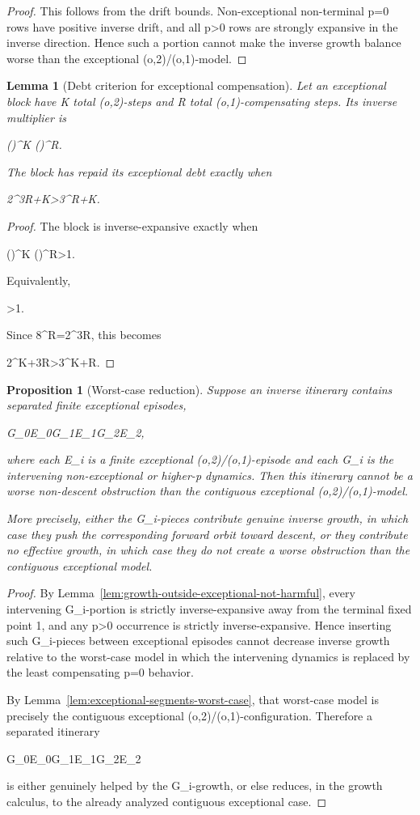 \documentclass[11pt,letterpaper]{amsart}
\def\({}%
\def\){}%
\def\[{ }%
\def\]{ }%
\theoremstyle{definition}
\theoremstyle{plain}
\newtheorem{lemma}{Lemma}
\newtheorem{proposition}{Proposition}
\theoremstyle{plain}
\theoremstyle{remark}
\begin{document}
\begin{proof}
This follows from the drift bounds.  Non-exceptional non-terminal \(p=0\) rows have positive inverse drift, and
all \(p>0\) rows are strongly expansive in the inverse direction.  Hence such a portion cannot make the inverse
growth balance worse than the exceptional \((o,2)/(o,1)\)-model.
\end{proof}

\begin{lemma}[Debt criterion for exceptional compensation]
\label{lem:exceptional-debt-criterion}
Let an exceptional block have \(K\) total \((o,2)\)-steps and \(R\) total
\((o,1)\)-compensating steps.  Its inverse multiplier is
\[
\left(\right)^K
\left(\right)^R.
\]
The block has repaid its exceptional debt exactly when
\[
2^{3R+K}>3^{R+K}.
\]
\end{lemma}

\begin{proof}
The block is inverse-expansive exactly when
\[
\left(\right)^K
\left(\right)^R>1.
\]
Equivalently,
\[
>1.
\]
Since \(8^R=2^{3R}\), this becomes
\[
2^{K+3R}>3^{K+R}.
\]
\end{proof}

\begin{proposition}[Worst-case reduction]
\label{prop:worst-case-reduction}
Suppose an inverse itinerary contains separated finite exceptional
episodes,
\[
G_0E_0G_1E_1G_2E_2\cdots ,
\]
where each \(E_i\) is a finite exceptional \((o,2)/(o,1)\)-episode and
each \(G_i\) is the intervening non-exceptional or higher-\(p\) dynamics.
Then this itinerary cannot be a worse non-descent obstruction than the
contiguous exceptional \((o,2)/(o,1)\)-model.

More precisely, either the \(G_i\)-pieces contribute genuine inverse
growth, in which case they push the corresponding forward orbit toward
descent, or they contribute no effective growth, in which case they do
not create a worse obstruction than the contiguous exceptional model.
\end{proposition}

\begin{proof}
By Lemma~\ref{lem:growth-outside-exceptional-not-harmful}, every
intervening \(G_i\)-portion is strictly inverse-expansive away from
the terminal fixed point \(1\), and any \(p>0\) occurrence is
strictly inverse-expansive.  Hence inserting such
\(G_i\)-pieces between exceptional episodes cannot decrease inverse
growth relative to the worst-case model in which the intervening dynamics
is replaced by the least compensating \(p=0\) behavior.

By Lemma~\ref{lem:exceptional-segments-worst-case}, that worst-case model
is precisely the contiguous exceptional \((o,2)/(o,1)\)-configuration.
Therefore a separated itinerary
\[
G_0E_0G_1E_1G_2E_2\cdots
\]
is either genuinely helped by the \(G_i\)-growth, or else reduces, in the
growth calculus, to the already analyzed contiguous exceptional case.
\end{proof}
\end{document}
